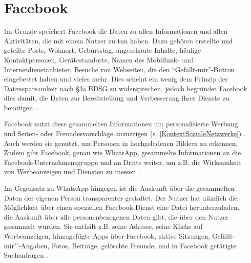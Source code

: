 \section{Facebook}
Im Grunde speichert Facebook die Daten zu allen Informationen und allen Aktivitäten, die mit einem Nutzer zu tun haben. Dazu gehören erstellte und geteilte Posts, Wohnort, Geburtstag, angeschaute Inhalte, häufige Kontaktpersonen, Gerätestandorte, Namen des Mobilfunk- und Internetdienstanbieter, Besuche von Webseiten, die den "`Gefällt-mir"'-Button eingebettet haben und vieles mehr. Dies scheint ein wenig dem Prinzip der Datensparsamkeit nach §3a BDSG zu widersprechen, jedoch begründet Facebook dies damit, die Daten zur Bereitstellung und Verbesserung ihrer Dienste zu benötigen \autocite[vgl.][]{FacebookInc..2017}.
\par
Facebook nutzt diese gesammelten Informationen um personalisierte Werbung und Seiten- oder Freundesvorschläge anzuzeigen (s. \vref{KontextSozialeNetzwerke}) . Auch werden sie genutzt, um Personen in hochgeladenen Bildern zu erkennen. Zudem gibt Facebook, genau wie WhatsApp, gesammelte Informationen an die Facebook-Unternehmensgruppe und an Dritte weiter, um z.B. die Wirksamkeit von Werbeanzeigen und Diensten zu messen \autocite[vgl.][]{FacebookInc..2017}. 
\par
Im Gegensatz zu WhatsApp hingegen ist die Auskunft über die gesammelten Daten der eigenen Person transparenter gestaltet. Der Nutzer hat nämlich die Möglichkeit über einen speziellen Facebook-Dienst eine Datei herunterzuladen, die Auskunft über alle personenbezogenen Daten gibt, die über den Nutzer gesammelt wurden. Sie enthält z.B. seine Adresse, seine Klicks auf Werbeanzeigen, hinzugefügte Apps über Facebook, aktive Sitzungen, Gefällt-mir"'-Angaben, Fotos, Beiträge, gelöschte Freunde, und in Facebook getätigte Suchanfragen \autocite[vgl.][]{FacebookInc..2017b}.

